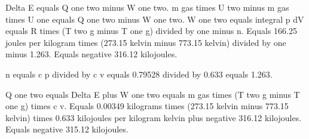Delta E equals Q one two minus W one two.  
m gas times U two minus m gas times U one equals Q one two minus W one two.  
W one two equals integral p dV equals R times (T two g minus T one g) divided by one minus n.  
Equals 166.25 joules per kilogram times (273.15 kelvin minus 773.15 kelvin) divided by one minus 1.263.  
Equals negative 316.12 kilojoules.  

n equals c p divided by c v equals 0.79528 divided by 0.633 equals 1.263.  

Q one two equals Delta E plus W one two equals m gas times (T two g minus T one g) times c v.  
Equals 0.00349 kilograms times (273.15 kelvin minus 773.15 kelvin) times 0.633 kilojoules per kilogram kelvin plus negative 316.12 kilojoules.  
Equals negative 315.12 kilojoules.